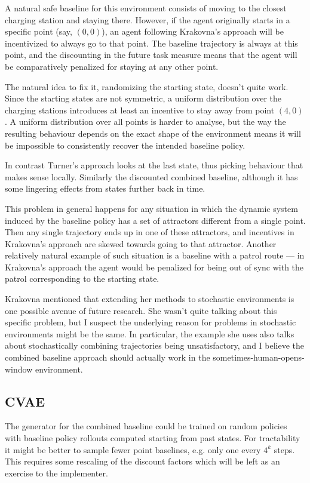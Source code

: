 \documentclass{article}
\begin{document}
		A natural safe baseline for this environment consists of moving to the closest charging station
		and staying there. However, if the agent originally starts in a specific point (say, $\left( 0,0 \right)$),
		an agent following Krakovna's approach will be incentivized to always go to that point.
		The baseline trajectory is always at this point, and the discounting in the future task measure
		means that the agent will be comparatively penalized for staying at any other point.

		The natural idea to fix it, randomizing the starting state, doesn't quite work. Since the starting states
		are not symmetric, a uniform distribution over the charging stations introduces at least an incentive
		to stay away from point $\left( 4,0 \right)$. A uniform distribution over all points is harder
		to analyse, but the way the resulting behaviour depends on the exact shape of the environment
		means it will be impossible to consistently recover the intended baseline policy.

		In contrast Turner's approach looks at the last state, thus picking behaviour that makes sense locally.
		Similarly the discounted combined baseline, although it has some lingering effects from states further
		back in time.

		This problem in general happens for any situation in which the dynamic system induced by the baseline
		policy has a set of attractors different from a single point. Then any single trajectory ends up
		in one of these attractors, and incentives in Krakovna's approach are skewed towards going to that
		attractor. Another relatively natural example of such situation is a baseline with a patrol route ––
		in Krakovna's approach the agent would be penalized for being out of sync with the patrol
		corresponding to the starting state.

		Krakovna mentioned that extending her methods to stochastic environments is one possible
		avenue of future research. She wasn't quite talking about this specific problem, but I suspect
		the underlying reason for problems in stochastic environments might be the same. In particular,
		the example she uses also talks about stochastically combining trajectories being unsatisfactory,
		and I believe the combined baseline approach should actually work in the sometimes-human-opens-window
		environment.

	\subsection{CVAE}
		The generator for the combined baseline could be trained on random policies with
		baseline policy rollouts	computed starting from past states. For tractability it might
		be better to sample fewer point baselines, e.g. only one every $4^k$ steps. This requires
		some rescaling of the discount factors which will be left as an exercise to the implementer.
\end{document}

